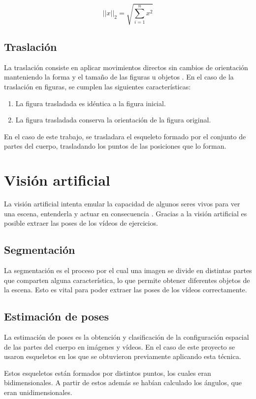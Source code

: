 \begin{equation}
	||x||_2 = \sqrt{\sum_{i=1}^{n}x^2}
\end{equation}
\label{norml2}

\subsection{Traslación}
La traslación consiste en aplicar movimientos directos sin cambios de orientación manteniendo la forma y el tamaño de las figuras u objetos \cite{traslacion}. En el caso de la traslación en figuras, se cumplen las siguientes características:
\begin{enumerate}
	\item La figura trasladada es idéntica a la figura inicial.
	\item La figura trasladada conserva la orientación de la figura original.
\end{enumerate}
En el caso de este trabajo, se trasladara el esqueleto formado por el conjunto de partes del cuerpo, trasladando los puntos de las posiciones que lo forman.

\section{Visión artificial}
La visión artificial intenta emular la capacidad de algunos seres vivos para ver una escena, entenderla y actuar en consecuencia \cite{visionartificial}. Gracias a la visión artificial es posible extraer las poses de los vídeos de ejercicios.
\subsection{Segmentación}
La segmentación es el proceso por el cual una imagen se divide en distintas partes que comparten alguna característica, lo que permite obtener diferentes objetos de la escena. Esto es vital para poder extraer las poses de los vídeos correctamente.

\subsection{Estimación de poses}
La estimación de poses es la obtención y clasificación de la configuración espacial de las partes del cuerpo en imágenes y vídeos. En el caso de este proyecto se usaron esqueletos en los que se obtuvieron previamente aplicando esta técnica.

Estos esqueletos están formados por distintos puntos, los cuales eran bidimensionales. A partir de estos además se habían calculado los ángulos, que eran unidimensionales.
